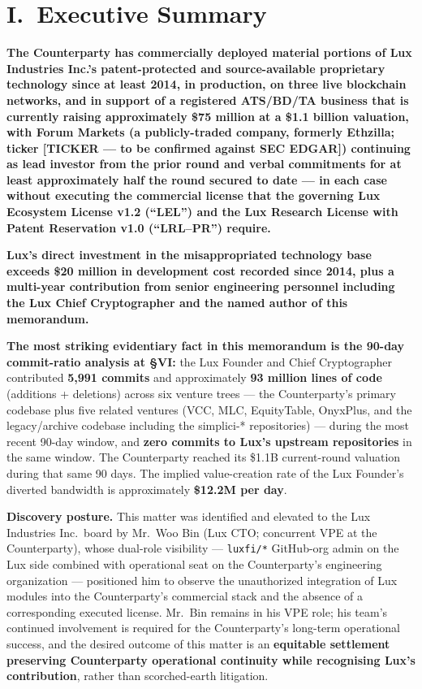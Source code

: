 \documentclass[11pt,letterpaper]{article}
\begin{document}
\section*{I.\ Executive Summary}

\textbf{The Counterparty has commercially deployed material portions
of Lux Industries Inc.'s patent-protected and source-available
proprietary technology since at least 2014, in production, on three
live blockchain networks, and in support of a registered ATS/BD/TA
business that is currently raising approximately \$75 million at a
\$1.1 billion valuation, with \textbf{Forum Markets} (a publicly-traded
company, formerly Ethzilla; ticker \textbf{[TICKER --- to be confirmed
against SEC EDGAR]}) continuing as lead investor from the prior round
and verbal commitments for at least approximately half the round
secured to date --- in each case without executing the commercial
license that the governing Lux Ecosystem License v1.2
(``LEL'') and the Lux Research License with Patent Reservation v1.0
(``LRL--PR'') require.}

\textbf{Lux's direct investment in the misappropriated technology
base exceeds \$20 million in development cost recorded since 2014,
plus a multi-year contribution from senior engineering personnel
including the Lux Chief Cryptographer and the named author of this
memorandum.}

\textbf{The most striking evidentiary fact in this memorandum is the
90-day commit-ratio analysis at \S VI:} the Lux Founder and Chief
Cryptographer contributed \textbf{5,991 commits} and approximately
\textbf{93 million lines of code} (additions + deletions) across six
venture trees --- the Counterparty's primary codebase plus five
related ventures (VCC, MLC, EquityTable, OnyxPlus, and the
legacy/archive codebase including the simplici-* repositories) ---
during the most recent 90-day window, and \textbf{zero commits to
Lux's upstream repositories} in the same window. The Counterparty
reached its \$1.1B current-round valuation during that same 90 days.
The implied value-creation rate of the Lux Founder's diverted
bandwidth is approximately \textbf{\$12.2M per day}.

\textbf{Discovery posture.} This matter was identified and elevated to
the Lux Industries Inc.\ board by Mr.\ Woo Bin (Lux CTO; concurrent
VPE at the Counterparty), whose dual-role visibility --- \texttt{luxfi/*}
GitHub-org admin on the Lux side combined with operational seat on the
Counterparty's engineering organization --- positioned him to observe
the unauthorized integration of Lux modules into the Counterparty's
commercial stack and the absence of a corresponding executed license.
Mr.\ Bin remains in his VPE role; his team's continued involvement is
required for the Counterparty's long-term operational success, and the
desired outcome of this matter is an \textbf{equitable settlement
preserving Counterparty operational continuity while recognising Lux's
contribution}, rather than scorched-earth litigation.
\end{document}
